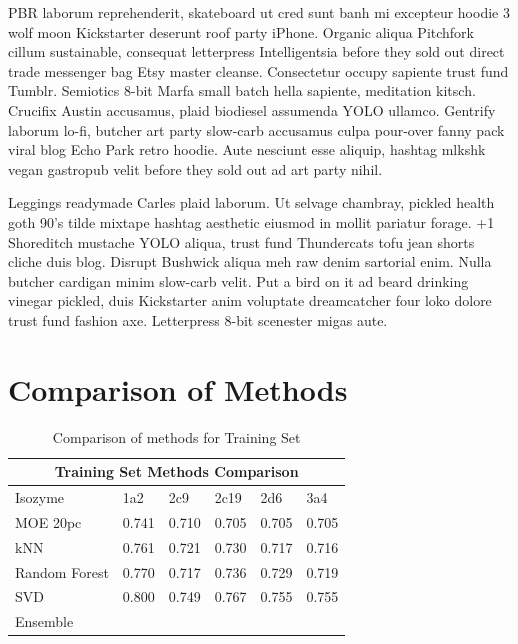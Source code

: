 PBR laborum reprehenderit, skateboard ut cred sunt banh mi excepteur hoodie 3 wolf moon Kickstarter deserunt roof party iPhone. Organic aliqua Pitchfork cillum sustainable, consequat letterpress Intelligentsia before they sold out direct trade messenger bag Etsy master cleanse. Consectetur occupy sapiente trust fund Tumblr. Semiotics 8-bit Marfa small batch hella sapiente, meditation kitsch. Crucifix Austin accusamus, plaid biodiesel assumenda YOLO ullamco. Gentrify laborum lo-fi, butcher art party slow-carb accusamus culpa pour-over fanny pack viral blog Echo Park retro hoodie. Aute nesciunt esse aliquip, hashtag mlkshk vegan gastropub velit before they sold out ad art party nihil.

Leggings readymade Carles plaid laborum. Ut selvage chambray, pickled health goth 90's tilde mixtape hashtag aesthetic eiusmod in mollit pariatur forage. +1 Shoreditch mustache YOLO aliqua, trust fund Thundercats tofu jean shorts cliche duis blog. Disrupt Bushwick aliqua meh raw denim sartorial enim. Nulla butcher cardigan minim slow-carb velit. Put a bird on it ad beard drinking vinegar pickled, duis Kickstarter anim voluptate dreamcatcher four loko dolore trust fund fashion axe. Letterpress 8-bit scenester migas aute.

\section{Comparison of Methods}

\begin{table}[!h]
\begin{tabular}{|l|l|l|l|l|l|}
\hline
\multicolumn{6}{|c|}{Training Set Methods Comparison} \\ \hline
Isozyme       & 1a2   & 2c9   & 2c19  & 2d6   & 3a4   \\ \hline
MOE 20pc      & 0.741 & 0.710 & 0.705 & 0.705 & 0.705 \\ \hline
kNN           & 0.761 & 0.721 & 0.730 & 0.717 & 0.716 \\ \hline
Random Forest & 0.770 & 0.717 & 0.736 & 0.729 & 0.719 \\ \hline
SVD           & 0.800 & 0.749 & 0.767 & 0.755 & 0.755 \\ \hline
Ensemble      &       &       &       &       &       \\ \hline
\end{tabular}
\caption{Comparison of methods for Training Set}
\end{table}

